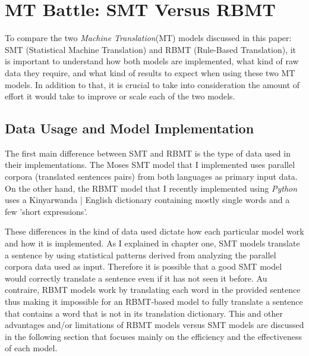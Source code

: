 \chapter{MT Battle: SMT Versus RBMT} %
To compare the two \textit{Machine Translation}(MT) models discussed in this paper: SMT (Statistical Machine Translation) and RBMT (Rule-Based Translation), it is important to understand how both models are implemented, what kind of raw data they require, and what kind of results to expect when using these two MT models. In addition to that, it is crucial to take into consideration the amount of effort it would take to improve or scale each of the two models. 
\section{Data Usage and Model Implementation}
The first main difference between SMT and RBMT is the type of data used in their implementations. The Moses SMT model that I implemented uses parallel corpora (translated sentences pairs) from both languages as primary input data. On the other hand, the RBMT model that I recently implemented using \textit{Python} uses a Kinyarwanda | English dictionary containing mostly single words and a few 'short expressions'. 

These differences in the kind of data used dictate how each particular model work and how it is implemented. As I explained in chapter one, SMT models translate a sentence by using statistical patterns derived from analyzing the parallel corpora data used as input\cite{Forcada2011}. Therefore it is possible that a good SMT model would correctly translate a sentence even if it has not seen it before\cite{Forcada2011}. Au contraire, RBMT models work by translating each word in the provided sentence thus making it impossible for an RBMT-based model to fully translate a sentence that contains a word that is not in its translation dictionary. This and other advantages and/or limitations of RBMT models versus SMT models are discussed in the following section that focuses mainly on the efficiency and the effectiveness of each model.

